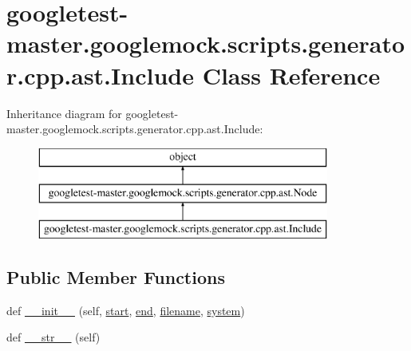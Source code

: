 \hypertarget{classgoogletest-master_1_1googlemock_1_1scripts_1_1generator_1_1cpp_1_1ast_1_1_include}{}\section{googletest-\/master.googlemock.\+scripts.\+generator.\+cpp.\+ast.\+Include Class Reference}
\label{classgoogletest-master_1_1googlemock_1_1scripts_1_1generator_1_1cpp_1_1ast_1_1_include}
Inheritance diagram for googletest-\/master.googlemock.\+scripts.\+generator.\+cpp.\+ast.\+Include\+:\begin{figure}[H]
\begin{center}
\leavevmode
\includegraphics[height=3.000000cm]{d8/db1/classgoogletest-master_1_1googlemock_1_1scripts_1_1generator_1_1cpp_1_1ast_1_1_include}
\end{center}
\end{figure}
\subsection*{Public Member Functions}
\begin{DoxyCompactItemize}
\item 
def \mbox{\hyperlink{classgoogletest-master_1_1googlemock_1_1scripts_1_1generator_1_1cpp_1_1ast_1_1_include_aa0f27421d9a999d7b29c211f48dffd7a}{\+\_\+\+\_\+init\+\_\+\+\_\+}} (self, \mbox{\hyperlink{classgoogletest-master_1_1googlemock_1_1scripts_1_1generator_1_1cpp_1_1ast_1_1_node_a6f9eb279a989f9ca27e7d0f1975336d1}{start}}, \mbox{\hyperlink{classgoogletest-master_1_1googlemock_1_1scripts_1_1generator_1_1cpp_1_1ast_1_1_node_a747e90ade89c1764e83b5b649bde18cc}{end}}, \mbox{\hyperlink{classgoogletest-master_1_1googlemock_1_1scripts_1_1generator_1_1cpp_1_1ast_1_1_include_a11a8287302b958e05447111d4f1cd744}{filename}}, \mbox{\hyperlink{classgoogletest-master_1_1googlemock_1_1scripts_1_1generator_1_1cpp_1_1ast_1_1_include_a24d31dd181f9490be09c625afa3e4f05}{system}})
\item 
def \mbox{\hyperlink{classgoogletest-master_1_1googlemock_1_1scripts_1_1generator_1_1cpp_1_1ast_1_1_include_ac4bb3488087e583245552d568fecc484}{\+\_\+\+\_\+str\+\_\+\+\_\+}} (self)
\end{DoxyCompactItemize}
